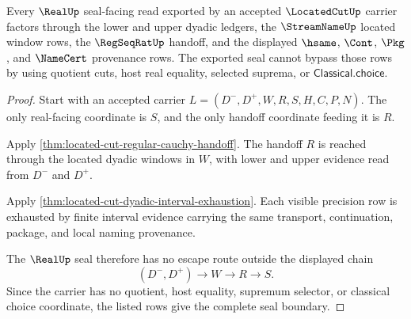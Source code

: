 \begin{theorem}
\label{thm:located-cut-real-seal-non-escape}
Every $\RealUp$ seal-facing read exported by an accepted $\LocatedCutUp$ carrier factors through the lower and upper dyadic ledgers, the $\StreamNameUp$ located window rows, the $\RegSeqRatUp$ handoff, and the displayed $\hsame$, $\Cont$, $\Pkg$, and $\NameCert$ provenance rows. The exported seal cannot bypass those rows by using quotient cuts, host real equality, selected suprema, or $\mathsf{Classical.choice}$.
\end{theorem}
\begin{proof}
Start with an accepted carrier $L=(D^{-},D^{+},W,R,S,H,C,P,N)$. The only real-facing coordinate is $S$, and the only handoff coordinate feeding it is $R$.

Apply \autoref{thm:located-cut-regular-cauchy-handoff}. The handoff $R$ is reached through the located dyadic windows in $W$, with lower and upper evidence read from $D^{-}$ and $D^{+}$.

Apply \autoref{thm:located-cut-dyadic-interval-exhaustion}. Each visible precision row is exhausted by finite interval evidence carrying the same transport, continuation, package, and local naming provenance.

The $\RealUp$ seal therefore has no escape route outside the displayed chain
$$
(D^{-},D^{+}) \longrightarrow W \longrightarrow R \longrightarrow S.
$$
Since the carrier has no quotient, host equality, supremum selector, or classical choice coordinate, the listed rows give the complete seal boundary.
\end{proof}

